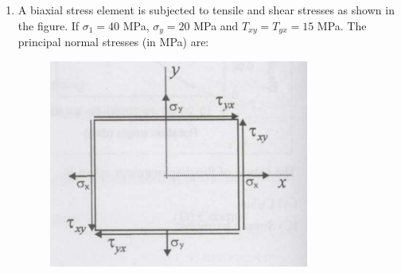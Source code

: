 \documentclass[journal,12pt,onecolumn]{IEEEtran}
\theoremstyle{remark}
\begin{document}
\begin{enumerate}[label=Q.\arabic*]
\item A biaxial stress element is subjected to tensile and shear stresses as shown in the figure. If $\sigma_1 = 40$ MPa, $\sigma_y = 20$ MPa and $T_{xy} = T_{yx} = 15$ MPa. The principal normal stresses (in MPa) are:
\newpage
\begin{figure}[h]
    \centering
    \includegraphics[width=0.3\linewidth]{figs/2.png}
    \label{fig:placeholder}
\end{figure} 


\end{enumerate}
\end{document}
